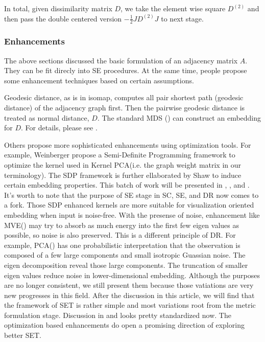 In total, given dissimilarity matrix $D$, we 
take the element wise square $D^{(2)}$ and then 
pass the double centered version $-\frac{1}{2}JD^{(2)}J$
to next stage. 

\subsubsection{Enhancements}
\label{sec:enhance}

The above sections discussed the basic formulation of an 
adjacency matrix $A$. They can be fit direcly into SE
procedures. At the same time, people propose some 
enhancement techniques based on certain assumptions. 

Geodesic distance, as is in isomap\cite{tenenbaum2000isomap}, 
computes all pair shortest path (geodesic distance) 
of the adjacency graph first. Then the pairwise geodesic distance 
is treated as normal distance, $D$. The standard MDS
(\rsec{\ref{sec:mds}}) can 
construct an embedding for $D$. For details, please see 
\rsec{\ref{sec:isomap}}. 

Others propose more sophisticated enhancements using optimization 
tools. For example, Weinberger\cite{weinberger2004learning} 
propose a Semi-Definite Programming framework to optimize the kernel 
used in Kernel PCA(i.e. the graph weight matrix in our terminology). 
The SDP framework is further ellaborated by Shaw\cite{shaw2007minimum}
to induce certain embedding properties. This batch of work will be presented 
in \rsec{\ref{sec:sde}}, \rsec{\ref{sec:mve}}, and \rsec{\ref{sec:spe}}.
It's worth to note that the purpose of SE stage in SC, SE, and DR now comes
to a fork. Those SDP enhanced kernels are more suitable for visualization 
oriented embedding when input is noise-free. With the presense of noise, 
enhancement like MVE(\rsec{\ref{sec:mve}}) may try to absorb as much energy 
into the first few eigen values as possible, so noise is also preserved. 
This is a different principle of DR. For example, PCA(\rsec{\ref{sec:pca}})
has one probabilistic interpretation that the observation is composed
of a few large components and small isotropic Guassian noise. The eigen decomposition 
reveal those large components. The truncation of smaller eigen values 
reduce noise in lower-dimensional embedding. 
Although the purposes are no longer consistent, we still present them 
because those vatiations are very new progresses in this field. After 
the discussion in this article, we will find that the framework of 
SET is rather simple and most variations root from the metric formulation 
stage. Discussion in \rsec{\ref{sec:metric_hdd}} and \rsec{\ref{sec:proximity}} 
looks pretty standardized now. The optimization based enhancements 
do open a promising direction of exploring better SET.

